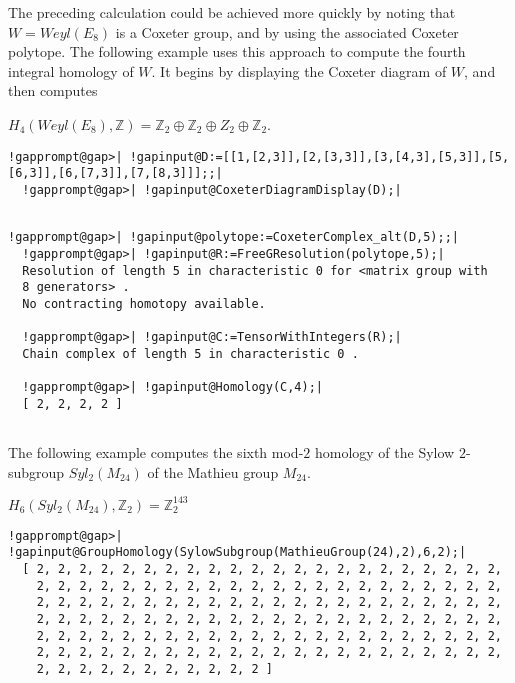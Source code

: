 \documentclass[a4paper,11pt]{report}
\begin{document}
{{\begin{Verbatim}[commandchars=!@|,fontsize=\small,frame=single,label=Example]
\end{Verbatim}
 

The preceding calculation could be achieved more quickly by noting that $W=Weyl(E_8)$ is a Coxeter group, and by using the associated Coxeter polytope. The
following example uses this approach to compute the fourth integral homology
of $W$. It begins by displaying the Coxeter diagram of $W$, and then computes 

$H_4(Weyl(E_8),\mathbb Z) = \mathbb Z_2 \oplus \mathbb Z_2 \oplus Z_2 \oplus
\mathbb Z_2$. 
\begin{Verbatim}[commandchars=!@|,fontsize=\small,frame=single,label=Example]
  !gapprompt@gap>| !gapinput@D:=[[1,[2,3]],[2,[3,3]],[3,[4,3],[5,3]],[5,[6,3]],[6,[7,3]],[7,[8,3]]];;|
  !gapprompt@gap>| !gapinput@CoxeterDiagramDisplay(D);|
  
\end{Verbatim}
  
\begin{Verbatim}[commandchars=!@|,fontsize=\small,frame=single,label=Example]
  !gapprompt@gap>| !gapinput@polytope:=CoxeterComplex_alt(D,5);;|
  !gapprompt@gap>| !gapinput@R:=FreeGResolution(polytope,5);|
  Resolution of length 5 in characteristic 0 for <matrix group with 
  8 generators> . 
  No contracting homotopy available. 
  
  !gapprompt@gap>| !gapinput@C:=TensorWithIntegers(R);|
  Chain complex of length 5 in characteristic 0 . 
  
  !gapprompt@gap>| !gapinput@Homology(C,4);|
  [ 2, 2, 2, 2 ]
  
\end{Verbatim}
 

The following example computes the sixth mod-$2$ homology of the Sylow $2$-subgroup $Syl_2(M_{24})$ of the Mathieu group $M_{24}$. 

$H_6(Syl_2(M_{24}),\mathbb Z_2) = \mathbb Z_2^{143}$ 
\begin{Verbatim}[commandchars=!@|,fontsize=\small,frame=single,label=Example]
  !gapprompt@gap>| !gapinput@GroupHomology(SylowSubgroup(MathieuGroup(24),2),6,2);|
  [ 2, 2, 2, 2, 2, 2, 2, 2, 2, 2, 2, 2, 2, 2, 2, 2, 2, 2, 2, 2, 2, 2, 
    2, 2, 2, 2, 2, 2, 2, 2, 2, 2, 2, 2, 2, 2, 2, 2, 2, 2, 2, 2, 2, 2, 
    2, 2, 2, 2, 2, 2, 2, 2, 2, 2, 2, 2, 2, 2, 2, 2, 2, 2, 2, 2, 2, 2, 
    2, 2, 2, 2, 2, 2, 2, 2, 2, 2, 2, 2, 2, 2, 2, 2, 2, 2, 2, 2, 2, 2, 
    2, 2, 2, 2, 2, 2, 2, 2, 2, 2, 2, 2, 2, 2, 2, 2, 2, 2, 2, 2, 2, 2, 
    2, 2, 2, 2, 2, 2, 2, 2, 2, 2, 2, 2, 2, 2, 2, 2, 2, 2, 2, 2, 2, 2, 
    2, 2, 2, 2, 2, 2, 2, 2, 2, 2, 2 ]
  

\end{Verbatim}}}
\end{document}
